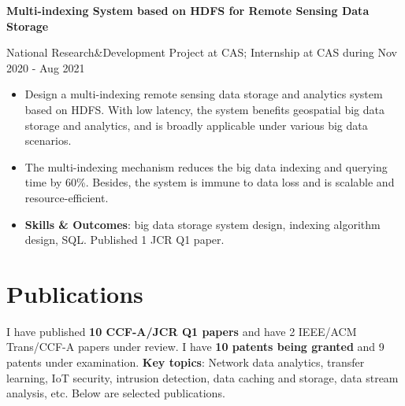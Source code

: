 \documentclass[letterpaper,10.9pt]{article}
\begin{document}
\vspace{1pt}

\textbf{Multi-indexing System based on HDFS for Remote Sensing Data Storage}

National Research\&Development Project at CAS; Internship at CAS during Nov 2020 - Aug 2021

\begin{itemize}
  \setlength\itemsep{2.0pt}
  \item Design a multi-indexing remote sensing data storage and analytics system based on HDFS. With low latency, the system benefits geospatial big data storage and analytics, and is broadly applicable under various big data scenarios. 
  \item The multi-indexing mechanism reduces the big data indexing and querying time by 60\%. Besides, the system is immune to data loss and is scalable and resource-efficient.
  \item \textbf{Skills \& Outcomes}: big data storage system design, indexing algorithm design, SQL. Published 1 JCR Q1 paper. 
\end{itemize}




\section{\textbf{Publications}}

I have published \textbf{10 CCF-A/JCR Q1 papers} and have 2 IEEE/ACM Trans/CCF-A papers under review. I have \textbf{10 patents being granted} and 9 patents under examination. \textbf{Key topics}: Network data analytics, transfer learning, IoT security, intrusion detection, data caching and storage, data stream analysis, etc. Below are selected publications. 
\end{document}
